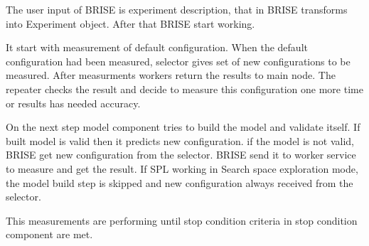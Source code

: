 The user input of BRISE is experiment description, that in BRISE transforms into Experiment object. After that BRISE start working.

It start with measurement of default configuration. When the default configuration had been measured, selector gives set of new configurations to be measured. After measurments workers return the results to main node. The repeater checks the result and decide to measure this configuration one more time or results has needed accuracy. 

On the next step model component tries to build the model and validate itself. If built model is valid then it predicts new configuration. if the model is not valid, BRISE get new configuration from the selector. BRISE send it to worker service to measure and get the result. If SPL working in Search space exploration mode, the model build step is skipped and new configuration always received from the selector. 

This measurements are performing until stop condition criteria in stop condition component are met.









